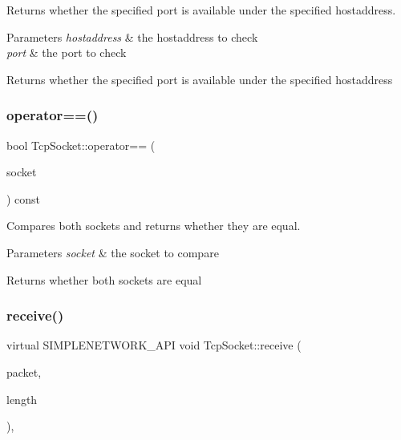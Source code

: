 Returns whether the specified port is available under the specified hostaddress. 


\begin{DoxyParams}{Parameters}
{\em hostaddress} & the hostaddress to check \\
\hline
{\em port} & the port to check \\
\hline
\end{DoxyParams}
\begin{DoxyReturn}{Returns}
whether the specified port is available under the specified hostaddress 
\end{DoxyReturn}
\mbox{\label{class_tcp_socket_a282abf062b6536eaa57e8ef7fec7a122}} 
\subsubsection{\texorpdfstring{operator==()}{operator==()}}
{\footnotesize\ttfamily bool Tcp\+Socket\+::operator== (\begin{DoxyParamCaption}\item[{const \mbox{\hyperlink{class_tcp_socket}{Tcp\+Socket}} \&}]{socket }\end{DoxyParamCaption}) const}



Compares both sockets and returns whether they are equal. 


\begin{DoxyParams}{Parameters}
{\em socket} & the socket to compare \\
\hline
\end{DoxyParams}
\begin{DoxyReturn}{Returns}
whether both sockets are equal 
\end{DoxyReturn}
\mbox{\label{class_tcp_socket_a5c2013596b0f1a79502984cfe48ff192}} 
\subsubsection{\texorpdfstring{receive()}{receive()}}
{\footnotesize\ttfamily virtual S\+I\+M\+P\+L\+E\+N\+E\+T\+W\+O\+R\+K\+\_\+\+A\+PI void Tcp\+Socket\+::receive (\begin{DoxyParamCaption}\item[{const char $\ast$}]{packet,  }\item[{uint}]{length }\end{DoxyParamCaption})\hspace{0.3cm}{\ttfamily [inline]}, {\ttfamily [virtual]}}




